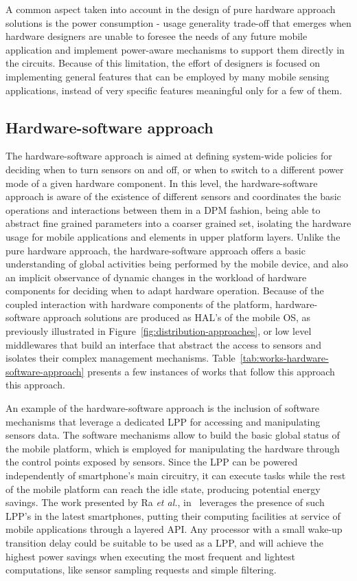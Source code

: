 \documentclass[12pt]{article}
\numberwithin{equation}{section}
\numberwithin{table}{section}
\numberwithin{figure}{section}
\begin{document}
A common aspect taken into account in the design of pure hardware approach solutions is the power consumption - usage generality trade-off that emerges when hardware designers are unable to foresee the needs of any future mobile application and implement power-aware mechanisms to support them directly in the circuits.
Because of this limitation, the effort of designers is focused on implementing general features that can be employed by many mobile sensing applications, instead of very specific features meaningful only for a few of them.

\subsection{Hardware-software approach}

The hardware-software approach is aimed at defining system-wide policies for deciding when to turn sensors on and off, or when to switch to a different power mode of a given hardware component.
In this level, the hardware-software approach is aware of the existence of different sensors and coordinates the basic operations and interactions between them in a DPM fashion, being able to abstract fine grained parameters into a coarser grained set, isolating the hardware usage for mobile applications and elements in upper platform layers.
Unlike the pure hardware approach, the hardware-software approach offers a basic understanding of global activities being performed by the mobile device, and also an implicit observance of dynamic changes in the workload of hardware components for deciding when to adapt hardware operation.
Because of the coupled interaction with hardware components of the platform, hardware-software approach solutions are produced as HAL's of the mobile OS, as previously illustrated in Figure~\ref{fig:distribution-approaches}, or low level middlewares that build an interface that abstract the access to sensors and isolates their complex management mechanisms.
Table~\ref{tab:works-hardware-software-approach} presents a few instances of works that follow this approach this approach.


An example of the hardware-software approach is the inclusion of software mechanisms that leverage a dedicated LPP for accessing and manipulating sensors data.
The software mechanisms allow to build the basic global status of the mobile platform, which is employed for manipulating the hardware through the control points exposed by sensors.
Since the LPP can be powered independently of smartphone's main circuitry, it can execute tasks while the rest of the mobile platform can reach the idle state, producing potential energy savings.
The work presented by Ra \emph{et al.}, in~\cite{Ra2012} leverages the presence of such LPP's in the latest smartphones, putting their computing facilities at service of mobile applications through a layered API. 
Any processor with a small wake-up transition delay could be suitable to be used as a LPP, and will achieve the highest power savings when executing the most frequent and lightest computations, like sensor sampling requests and simple filtering.
\end{document}
